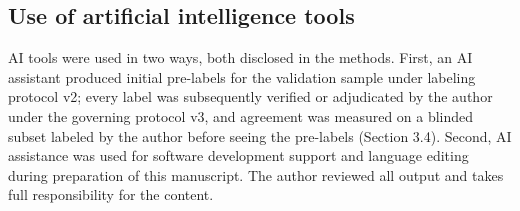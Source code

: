 \documentclass[pdflatex,sn-basic]{sn-jnl}
\begin{document}
\subsection*{Use of artificial intelligence tools}
AI tools were used in two ways, both disclosed in the methods. First, an AI
assistant produced initial pre-labels for the validation sample under
labeling protocol v2; every label was subsequently verified or adjudicated
by the author under the governing protocol v3, and agreement was measured
on a blinded subset labeled by the author before seeing the pre-labels
(Section 3.4). Second, AI assistance was used for software development
support and language editing during preparation of this manuscript. The
author reviewed all output and takes full responsibility for the content.

\nocite{CISBenchmark,NSA2022,K8sPSS,ToolDocs}
\end{document}
